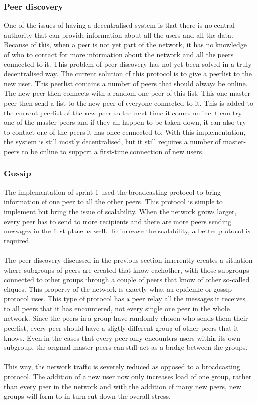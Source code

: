 \documentclass[]{article}
\begin{document}
\subsubsection{Peer discovery}
One of the issues of having a decentralised system is that there is no central authority that can provide information about all the users and all the data. 
Because of this, when a peer is not yet part of the network, it has no knowledge of who to contact for more information about the network and all the peers connected to it. 
This problem of peer discovery has not yet been solved in a truly decentralised way. 
The current solution of this protocol is to give a peerlist to the new user. 
This peerlist contains a number of peers that should always be online. 
The new peer then connects with a random one peer of this list. 
This one master-peer then send a list to the new peer of everyone connected to it. 
This is added to the current peerlist of the new peer so the next time it comes online it can try one of the master peers and if they all happen to be taken down, it can also try to contact one of the peers it has once connected to.
With this implementation, the system is still mostly decentralised, but it still requires a number of master-peers to be online to support a first-time connection of new users.
\subsubsection{Gossip}
The implementation of sprint 1 used the broadcasting protocol to bring information of one peer to all the other peers.
This protocol is simple to implement but bring the issue of scalability. 
When the network grows larger, every peer has to send to more recipients and there are more peers sending messages in the first place as well.
To increase the scalability, a better protocol is required.\\
\\
The peer discovery discussed in the previous section inherently creates a situation where subgroups of peers are created that know eachother, with those subgroups connected to other groups through a couple of peers that know of other so-called cliques.
This property of the network is exactly what an epidemic or gossip protocol uses.
This type of protocol has a peer relay all the messages it receives to all peers that it has encountered, not every single one peer in the whole network.
Since the peers in a group have randomly chosen who sends them their peerlist, every peer should have a sligtly different group of other peers that it knows.
Even in the cases that every peer only encounters users within its own subgroup, the original master-peers can still act as a bridge between the groups.\\
\\
This way, the network traffic is severely reduced as opposed to a broadcasting protocol.
The addition of a new user now only increases load of one group, rather than every peer in the network and with the addition of many new peers, new groups will form to in turn cut down the overall stress.
\end{document}
